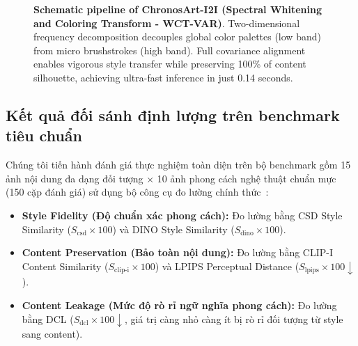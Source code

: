 \documentclass[10pt,twocolumn,letterpaper]{article}
\begin{document}
\begin{figure}[t]
\caption{\textbf{Schematic pipeline of ChronosArt-I2I (Spectral Whitening and Coloring Transform - WCT-VAR)}. Two-dimensional frequency decomposition decouples global color palettes (low band) from micro brushstrokes (high band). Full covariance alignment enables vigorous style transfer while preserving 100\% of content silhouette, achieving ultra-fast inference in just 0.14 seconds.}
\label{fig:tikz_i2i}
\end{figure}

\subsection{Kết quả đối sánh định lượng trên benchmark tiêu chuẩn}
\label{subsec:i2i_eval}

Chúng tôi tiến hành đánh giá thực nghiệm toàn diện trên bộ benchmark gồm 15 ảnh nội dung đa dạng đối tượng $\times$ 10 ảnh phong cách nghệ thuật chuẩn mực (150 cặp đánh giá) sử dụng bộ công cụ đo lường chính thức~\cite{Lee_2026_CVPR}:
\begin{itemize}
    \item \textbf{Style Fidelity (Độ chuẩn xác phong cách):} Đo lường bằng CSD Style Similarity ($S_{\text{csd}} \times 100$) và DINO Style Similarity ($S_{\text{dino}} \times 100$).
    \item \textbf{Content Preservation (Bảo toàn nội dung):} Đo lường bằng CLIP-I Content Similarity ($S_{\text{clip-i}} \times 100$) và LPIPS Perceptual Distance ($S_{\text{lpips}} \times 100 \downarrow$).
    \item \textbf{Content Leakage (Mức độ rò rỉ ngữ nghĩa phong cách):} Đo lường bằng DCL ($S_{\text{dcl}} \times 100 \downarrow$, giá trị càng nhỏ càng ít bị rò rỉ đối tượng từ style sang content).
\end{itemize}
\end{document}
